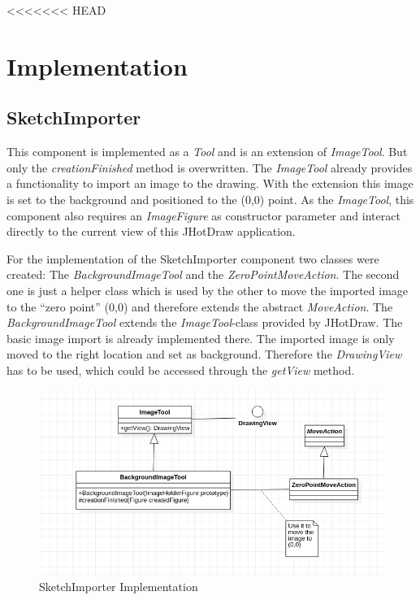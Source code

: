 <<<<<<< HEAD
\section{Implementation}

\subsection{SketchImporter}

This component is implemented as a \textit{Tool} and is an extension of \textit{ImageTool}. But only the \textit{creationFinished} method is overwritten. The \textit{ImageTool} already provides a functionality to import an image to the drawing. With the extension this image is set to the background and positioned to the (0,0) point. As the \textit{ImageTool}, this component also requires an \textit{ImageFigure} as constructor parameter and interact directly to the current view of this JHotDraw application.

For the implementation of the SketchImporter component two classes were created: The \textit{BackgroundImageTool} and the \textit{ZeroPointMoveAction}. The second one is just a helper class which is used by the other to move the imported image to the "`zero point"' (0,0) and therefore extends the abstract \textit{MoveAction}.
The \textit{BackgroundImageTool} extends the \textit{ImageTool}-class provided by JHotDraw. The basic image import is already implemented there. The imported image is only moved to the right location and set as background. Therefore the \textit{DrawingView} has to be used, which could be accessed through the \textit{getView} method.

\begin{figure}[h]
    \includegraphics[keepaspectratio,width=\textwidth]{images/SketchImporter.png}
    \caption{SketchImporter Implementation}
\end{figure}

